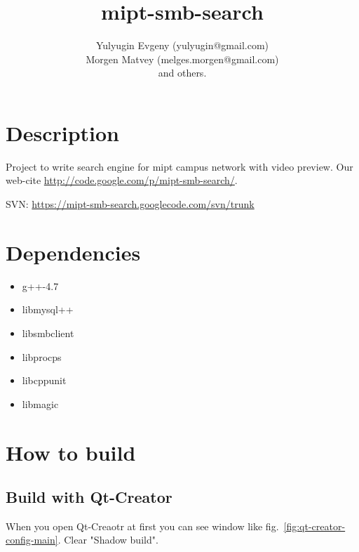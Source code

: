\documentclass[11pt, oneside, a4paper]{scrartcl}
\begin{document}
\title{mipt-smb-search}

\author{Yulyugin Evgeny (yulyugin@gmail.com) \\
Morgen Matvey (melges.morgen@gmail.com) \\
and others.}

\maketitle

\section{Description}

Project to write search engine for mipt campus network with video preview. Our web-cite \url{http://code.google.com/p/mipt-smb-search/}.

SVN: \url{https://mipt-smb-search.googlecode.com/svn/trunk}

\section{Dependencies}

\begin{itemize}
  \item g++-4.7
  \item libmysql++
  \item libsmbclient
  \item libprocps
  \item libcppunit
  \item libmagic
\end{itemize}

\section{How to build}\label{sec:build}

\subsection{Build with Qt-Creator}

When you open Qt-Creaotr at first you can see window like fig.~\ref{fig:qt-creator-config-main}. Clear "Shadow build".
\end{document}
